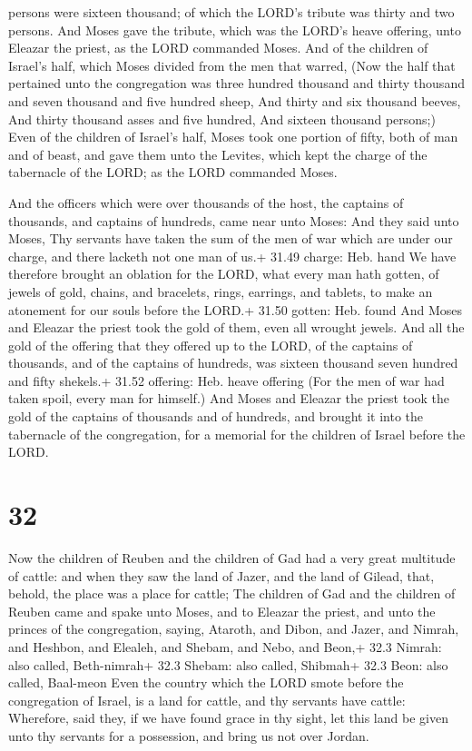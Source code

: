 persons were sixteen thousand; of which the LORD's tribute was thirty
and two persons.  And Moses gave the tribute, which was the
LORD's heave offering, unto Eleazar the priest, as the LORD commanded
Moses.  And of the children of Israel's half, which Moses
divided from the men that warred,  (Now the half that
pertained unto the congregation was three hundred thousand and thirty
thousand and seven thousand and five hundred sheep,  And
thirty and six thousand beeves,  And thirty thousand asses
and five hundred,  And sixteen thousand persons;)
 Even of the children of Israel's half, Moses took one
portion of fifty, both of man and of beast, and gave them unto the
Levites, which kept the charge of the tabernacle of the LORD; as the
LORD commanded Moses.

 And the officers which were over thousands of the host,
the captains of thousands, and captains of hundreds, came near unto
Moses:  And they said unto Moses, Thy servants have taken
the sum of the men of war which are under our charge, and there lacketh
not one man of us.+ 31.49 charge: Heb. hand  We have
therefore brought an oblation for the LORD, what every man hath gotten,
of jewels of gold, chains, and bracelets, rings, earrings, and tablets,
to make an atonement for our souls before the LORD.+ 31.50 gotten: Heb.
found  And Moses and Eleazar the priest took the gold of
them, even all wrought jewels.  And all the gold of the
offering that they offered up to the LORD, of the captains of thousands,
and of the captains of hundreds, was sixteen thousand seven hundred and
fifty shekels.+ 31.52 offering: Heb. heave offering  (For
the men of war had taken spoil, every man for himself.) 
And Moses and Eleazar the priest took the gold of the captains of
thousands and of hundreds, and brought it into the tabernacle of the
congregation, for a memorial for the children of Israel before the LORD.

\hypertarget{section-31}{%
\section{32}\label{section-31}}

 Now the children of Reuben and the children of Gad had a
very great multitude of cattle: and when they saw the land of Jazer, and
the land of Gilead, that, behold, the place was a place for cattle;
 The children of Gad and the children of Reuben came and
spake unto Moses, and to Eleazar the priest, and unto the princes of the
congregation, saying,  Ataroth, and Dibon, and Jazer, and
Nimrah, and Heshbon, and Elealeh, and Shebam, and Nebo, and Beon,+ 32.3
Nimrah: also called, Beth-nimrah+ 32.3 Shebam: also called, Shibmah+
32.3 Beon: also called, Baal-meon  Even the country which
the LORD smote before the congregation of Israel, is a land for cattle,
and thy servants have cattle:  Wherefore, said they, if we
have found grace in thy sight, let this land be given unto thy servants
for a possession, and bring us not over Jordan.

